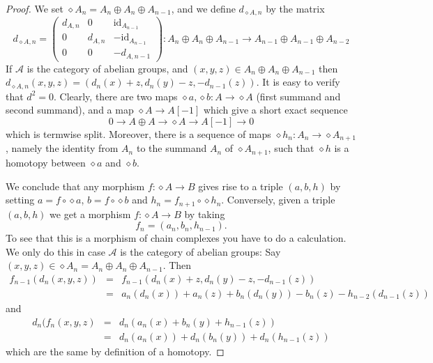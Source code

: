 \documentclass{stacks-project}
\theoremstyle{plain}
\theoremstyle{definition}
\theoremstyle{remark}
\numberwithin{equation}{subsection}
\begin{document}
\begin{proof}
We set $\diamond A_n = A_n \oplus A_n \oplus A_{n - 1}$,
and we define $d_{\diamond A, n}$ by the matrix
$$
d_{\diamond A, n}
=
\left(
\begin{matrix}
d_{A, n} & 0 & \text{id}_{A_{n - 1}} \\
0 & d_{A, n} & -\text{id}_{A_{n - 1}} \\
0 & 0 & -d_{A, n - 1}
\end{matrix}
\right) :
A_n \oplus A_n \oplus A_{n - 1} \to
A_{n - 1} \oplus A_{n - 1} \oplus A_{n - 2}
$$
If $\mathcal{A}$ is the category of abelian groups,
and $(x, y, z) \in A_n \oplus A_n \oplus A_{n - 1}$
then $d_{\diamond A, n}(x, y, z) = (d_n(x) + z, d_n(y) - z, -d_{n - 1}(z))$.
It is easy to verify that $d^2 = 0$. Clearly,
there are two maps $\diamond a, \diamond b : A \to \diamond A$
(first summand and second summand),
and a map $\diamond A \to A[-1]$ which give
a short exact sequence
$$
0 \to
A \oplus A \to
\diamond A \to
A[-1] \to
0
$$
which is termwise split. Moreover, there is a sequence
of maps $\diamond h_n : A_n \to \diamond A_{n + 1}$, namely
the identity from $A_n$ to the summand $A_n$ of $\diamond A_{n + 1}$,
such that $\diamond h$ is a homotopy between $\diamond a$ and $\diamond b$.

\medskip\noindent
We conclude that any morphism $f : \diamond A \to B$
gives rise to a triple $(a, b, h)$ by setting $a = f \circ \diamond a$,
$b = f \circ \diamond b$ and $h_n = f_{n + 1} \circ \diamond h_n$.
Conversely, given a triple $(a, b, h)$ we get a morphism
$f : \diamond A \to B$ by taking
$$
f_n = (a_n, b_n, h_{n - 1}).
$$
To see that this is a morphism of chain complexes you have
to do a calculation. We only do this in case $\mathcal{A}$
is the category of abelian groups:
Say $(x, y, z) \in \diamond A_n = A_n \oplus A_n \oplus A_{n - 1}$.
Then
\begin{eqnarray*}
f_{n - 1}(d_n(x, y, z)) & = &
f_{n - 1}(d_n(x) + z, d_n(y) - z, -d_{n - 1}(z)) \\
& = &
a_n(d_n(x)) + a_n(z) + b_n(d_n(y)) - b_n(z) - h_{n - 2}(d_{n - 1}(z))
\end{eqnarray*}
and
\begin{eqnarray*}
d_n(f_n(x, y, z) & = &
d_n(a_n(x) + b_n(y) + h_{n - 1}(z)) \\
& = &
d_n(a_n(x)) + d_n(b_n(y)) + d_n(h_{n - 1}(z))
\end{eqnarray*}
which are the same by definition of a homotopy.
\end{proof}
\end{document}
